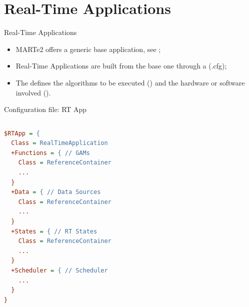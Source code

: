
\section{Real-Time Applications}
\graphicspath{{figs/section3/}}

\begin{frame}{Real-Time Applications}
	\begin{itemize}
		\item MARTe2 offers a generic base application, see ;
		\item Real-Time Applications are built from the base one through a  (.cfg);
		\item The  defines the algorithms to be executed () and the hardware or software involved ().
	\end{itemize}
\end{frame}

\begin{frame}[fragile]{Configuration file: RT App}
	\begin{columns}
		\begin{lstlisting}[style=small, language=cfg]
$RTApp = {
  Class = RealTimeApplication
  +Functions = { // GAMs
    Class = ReferenceContainer
    ...
  }
  +Data = { // Data Sources
    Class = ReferenceContainer
    ...
  }
  +States = { // RT States
    Class = ReferenceContainer
    ...
  }
  +Scheduler = { // Scheduler
    ...
  }
}\end{lstlisting}
	\end{columns}
\end{frame}

